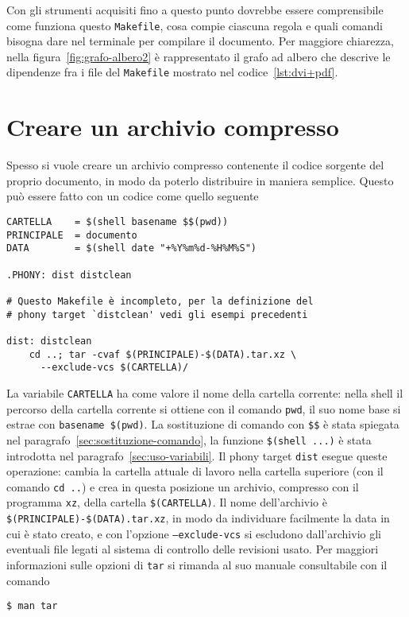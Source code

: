Con gli strumenti acquisiti fino a questo punto dovrebbe essere comprensibile
come funziona questo \texttt{Makefile}, cosa compie ciascuna regola e quali
comandi bisogna dare nel terminale per compilare il documento.  Per maggiore
chiarezza, nella figura~\ref{fig:grafo-albero2} è rappresentato il grafo ad
albero che descrive le dipendenze fra i file del \texttt{Makefile} mostrato nel
codice~\ref{lst:dvi+pdf}.

\section{Creare un archivio compresso}
\label{sec:creare-archivio}

Spesso si vuole creare un archivio compresso contenente il codice sorgente del
proprio documento, in modo da poterlo distribuire in maniera semplice.  Questo
può essere fatto con un codice come quello seguente
\begin{lstlisting}
CARTELLA	= $(shell basename $$(pwd))
PRINCIPALE	= documento
DATA		= $(shell date "+%Y%m%d-%H%M%S")

.PHONY: dist distclean

# Questo Makefile è incompleto, per la definizione del
# phony target `distclean' vedi gli esempi precedenti

dist: distclean
	cd ..; tar -cvaf $(PRINCIPALE)-$(DATA).tar.xz \
	  --exclude-vcs $(CARTELLA)/
\end{lstlisting} %
La variabile \texttt{CARTELLA} ha come valore il nome della cartella corrente:
nella shell il percorso della cartella corrente si ottiene con il comando
\texttt{pwd}, il suo nome base si estrae con \texttt{basename \$(pwd)}.  La
sostituzione di comando con \texttt{\$\$} è stata spiegata nel
paragrafo~\ref{sec:sostituzione-comando}, la funzione \texttt{\$(shell ...)} è
stata introdotta nel paragrafo~\ref{sec:uso-variabili}.  Il phony target
\texttt{dist} esegue queste operazione: cambia la cartella attuale di lavoro
nella cartella superiore (con il comando \texttt{cd ..}) e crea in questa
posizione un archivio, compresso con il programma \texttt{xz}, della cartella
\texttt{\$(CARTELLA)}.  Il nome dell'archivio è
\texttt{\$(PRINCIPALE)-\$(DATA).tar.xz}, in modo da individuare facilmente la
data in cui è stato creato, e con l'opzione \texttt{--exclude-vcs} si escludono
dall'archivio gli eventuali file legati al sistema di controllo delle revisioni
usato.  Per maggiori informazioni sulle opzioni di \texttt{tar} si rimanda al
suo manuale consultabile con il comando
\begin{verbatim}
$ man tar
\end{verbatim}

